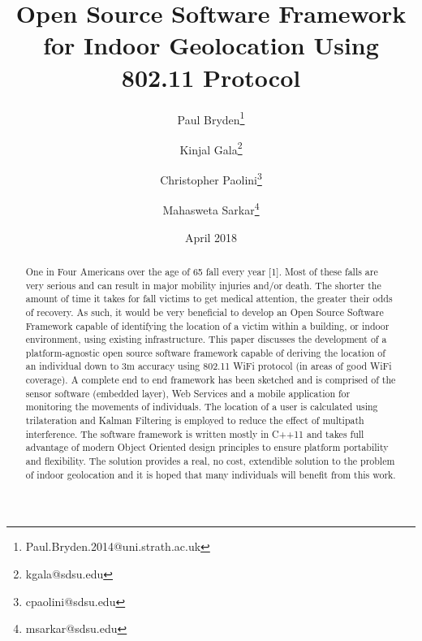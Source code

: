 \documentclass[conference]{IEEEtran}
\title{Open Source Software Framework for Indoor Geolocation Using 802.11 Protocol}
\date{April 2018}
\begin{document}
\author[1]{Paul Bryden\thanks{Paul.Bryden.2014@uni.strath.ac.uk}}
\author[2]{Kinjal Gala\thanks{kgala@sdsu.edu}}
\author[2]{Christopher Paolini\thanks{cpaolini@sdsu.edu}}
\author[2]{Mahasweta Sarkar\thanks{msarkar@sdsu.edu}}

\renewcommand\Authands{ and }
\maketitle
\begin{abstract}
	One in Four Americans over the age of 65 fall every year [1].  Most of these falls are very serious and can result in major mobility injuries and/or death. The shorter the amount of time it takes for fall victims to get medical attention, the greater their odds of recovery. As such, it would be very beneficial to develop an Open Source Software Framework capable of identifying the location of a victim within a building, or indoor environment, using existing infrastructure. 
\newline \indent This paper discusses the development of a platform-agnostic open source software framework capable of deriving the location of an individual down to 3m accuracy using 802.11 WiFi protocol (in areas of good WiFi coverage). A complete end to end framework has been sketched and is comprised of the sensor software (embedded layer), Web Services and a mobile application for monitoring the movements of individuals. The location of a user is calculated using trilateration and Kalman Filtering is employed to reduce the effect of multipath interference. The software framework is written mostly in C++11 and takes full advantage of modern Object Oriented design principles to ensure platform portability and flexibility. The solution provides a real, no cost, extendible solution to the problem of indoor geolocation and it is hoped that many individuals will benefit from this work.
\end{abstract}
\end{document}
